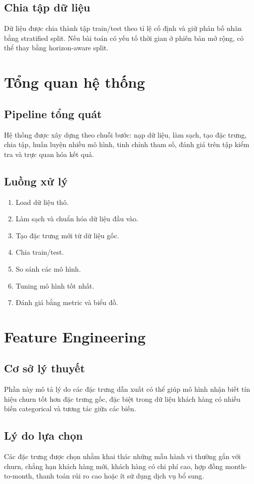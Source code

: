 \documentclass[conference]{IEEEtran}
\begin{document}
\subsection{Chia tập dữ liệu}
Dữ liệu được chia thành tập train/test theo tỉ lệ cố định và giữ phân bố nhãn bằng stratified split. Nếu bài toán có yếu tố thời gian ở phiên bản mở rộng, có thể thay bằng horizon-aware split.

\section{Tổng quan hệ thống}
\subsection{Pipeline tổng quát}
Hệ thống được xây dựng theo chuỗi bước: nạp dữ liệu, làm sạch, tạo đặc trưng, chia tập, huấn luyện nhiều mô hình, tinh chỉnh tham số, đánh giá trên tập kiểm tra và trực quan hóa kết quả.

\subsection{Luồng xử lý}
\begin{enumerate}
    \item Load dữ liệu thô.
    \item Làm sạch và chuẩn hóa dữ liệu đầu vào.
    \item Tạo đặc trưng mới từ dữ liệu gốc.
    \item Chia train/test.
    \item So sánh các mô hình.
    \item Tuning mô hình tốt nhất.
    \item Đánh giá bằng metric và biểu đồ.
\end{enumerate}

\section{Feature Engineering}
\subsection{Cơ sở lý thuyết}
Phần này mô tả lý do các đặc trưng dẫn xuất có thể giúp mô hình nhận biết tín hiệu churn tốt hơn đặc trưng gốc, đặc biệt trong dữ liệu khách hàng có nhiều biến categorical và tương tác giữa các biến.

\subsection{Lý do lựa chọn}
Các đặc trưng được chọn nhằm khai thác những mẫu hành vi thường gắn với churn, chẳng hạn khách hàng mới, khách hàng có chi phí cao, hợp đồng month-to-month, thanh toán rủi ro cao hoặc ít sử dụng dịch vụ bổ sung.
\end{document}
